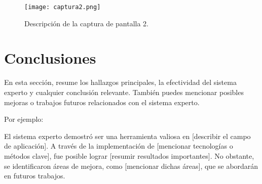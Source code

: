 \documentclass{article}
\begin{document}
\begin{figure}[h!]
  \centering
  \texttt{[image: captura2.png]}
  \caption{Descripción de la captura de pantalla 2.}
\end{figure}

\section{Conclusiones}

En esta sección, resume los hallazgos principales, la efectividad del sistema experto y cualquier conclusión relevante. También puedes mencionar posibles mejoras o trabajos futuros relacionados con el sistema experto.

Por ejemplo:

El sistema experto demostró ser una herramienta valiosa en [describir el campo de aplicación]. A través de la implementación de [mencionar tecnologías o métodos clave], fue posible lograr [resumir resultados importantes]. No obstante, se identificaron áreas de mejora, como [mencionar dichas áreas], que se abordarán en futuros trabajos.
\end{document}
